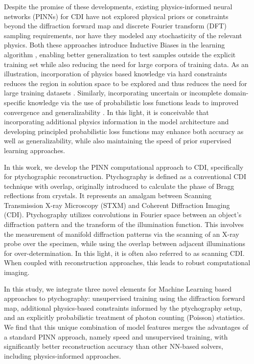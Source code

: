 \documentclass[sn-mathphys]{sn-jnl}%
\theoremstyle{thmstyleone}%
\theoremstyle{thmstyletwo}%
\theoremstyle{thmstylethree}%
\begin{document}
Despite the promise of these developments, existing physics-informed neural networks (PINNs) for CDI have not explored physical priors or constraints beyond the diffraction forward map and discrete Fourier transform (DFT) sampling requirements, nor have they modeled any stochasticity of the relevant physics. Both these approaches introduce Inductive Biases in the learning algorithm \cite{mitchell1980need, baxter2000model}, enabling better generalization to test samples outside the explicit training set while also reducing the need for large corpora of training data. As an illustration, incorporation of physics based knowledge via hard constraints reduces the region in solution space to be explored and thus reduces the need for large training datasets \cite{baker2019workshop}. Similarly, incorporating uncertain or incomplete domain-specific knowledge via the use of probabilistic loss functions leads to improved convergence and generalizability \cite{baker2019workshop}. In this light, it is conceivable that incorporating additional physics information in the model architecture and developing principled probabilistic loss functions may enhance both accuracy as well as generalizability, while also maintaining the speed of prior supervised learning approaches. 

In this work, we develop the PINN computational approach to CDI, specifically for ptychographic reconstruction. Ptychography is defined as a conventional CDI technique with overlap, originally introduced to calculate the phase of Bragg reflections from crystals. It represents an amalgam between Scanning Transmission X-ray Microscopy (STXM) and Coherent Diffraction Imaging (CDI). Ptychography utilizes convolutions in Fourier space between an object's diffraction pattern and the transform of the illumination function. This involves the measurement of manifold diffraction patterns via the scanning of an X-ray probe over the specimen, while using the overlap between adjacent illuminations for over-determination. In this light, it is often also referred to as scanning CDI. When coupled with reconstruction approaches, this leads to robust computational imaging. 

In this study, we integrate three novel elements for Machine Learning based approaches to ptychography: unsupervised training using the diffraction forward map, additional physics-based constraints informed by the ptychography setup, and an explicitly probabilistic treatment of photon counting (Poisson) statistics. We find that this unique combination of model features merges the advantages of a standard PINN approach, namely speed and unsupervised training, with significantly better reconstruction accuracy than other NN-based solvers, including physics-informed approaches.
\end{document}
